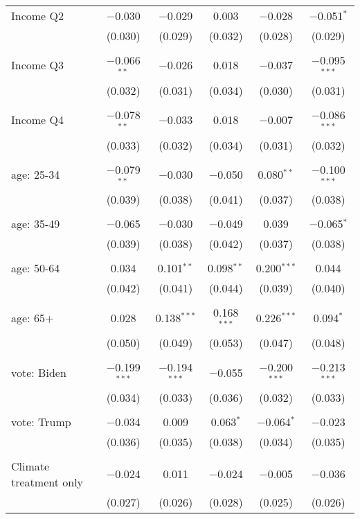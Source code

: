\begin{tabular}{@{\extracolsep{5pt}}lccccc}
 Income Q2 & $-$0.030 & $-$0.029 & 0.003 & $-$0.028 & $-$0.051$^{*}$ \\ 
  & (0.030) & (0.029) & (0.032) & (0.028) & (0.029) \\ 
  & & & & & \\ 
 Income Q3 & $-$0.066$^{**}$ & $-$0.026 & 0.018 & $-$0.037 & $-$0.095$^{***}$ \\ 
  & (0.032) & (0.031) & (0.034) & (0.030) & (0.031) \\ 
  & & & & & \\ 
 Income Q4 & $-$0.078$^{**}$ & $-$0.033 & 0.018 & $-$0.007 & $-$0.086$^{***}$ \\ 
  & (0.033) & (0.032) & (0.034) & (0.031) & (0.032) \\ 
  & & & & & \\ 
 age: 25-34 & $-$0.079$^{**}$ & $-$0.030 & $-$0.050 & 0.080$^{**}$ & $-$0.100$^{***}$ \\ 
  & (0.039) & (0.038) & (0.041) & (0.037) & (0.038) \\ 
  & & & & & \\ 
 age: 35-49 & $-$0.065 & $-$0.030 & $-$0.049 & 0.039 & $-$0.065$^{*}$ \\ 
  & (0.039) & (0.038) & (0.042) & (0.037) & (0.038) \\ 
  & & & & & \\ 
 age: 50-64 & 0.034 & 0.101$^{**}$ & 0.098$^{**}$ & 0.200$^{***}$ & 0.044 \\ 
  & (0.042) & (0.041) & (0.044) & (0.039) & (0.040) \\ 
  & & & & & \\ 
 age: 65+ & 0.028 & 0.138$^{***}$ & 0.168$^{***}$ & 0.226$^{***}$ & 0.094$^{*}$ \\ 
  & (0.050) & (0.049) & (0.053) & (0.047) & (0.048) \\ 
  & & & & & \\ 
 vote: Biden & $-$0.199$^{***}$ & $-$0.194$^{***}$ & $-$0.055 & $-$0.200$^{***}$ & $-$0.213$^{***}$ \\ 
  & (0.034) & (0.033) & (0.036) & (0.032) & (0.033) \\ 
  & & & & & \\ 
 vote: Trump & $-$0.034 & 0.009 & 0.063$^{*}$ & $-$0.064$^{*}$ & $-$0.023 \\ 
  & (0.036) & (0.035) & (0.038) & (0.034) & (0.035) \\ 
  & & & & & \\ 
 Climate treatment only & $-$0.024 & 0.011 & $-$0.024 & $-$0.005 & $-$0.036 \\ 
  & (0.027) & (0.026) & (0.028) & (0.025) & (0.026) \\ 

\end{tabular}
